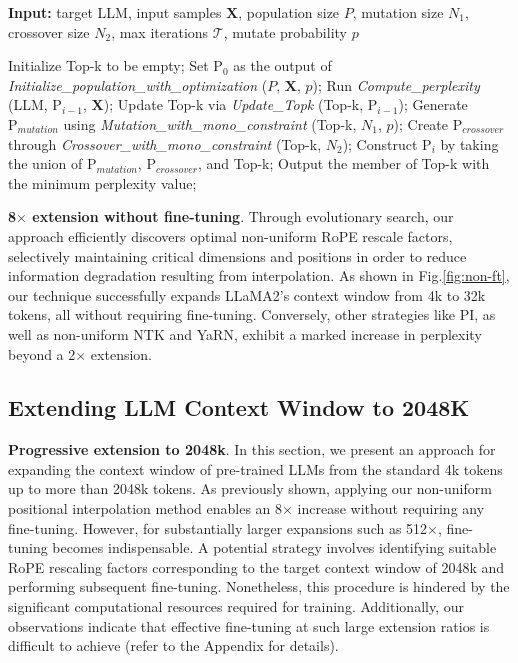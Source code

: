 \begin{algorithm}[t]
	\small
	\caption{The search algorithm}
	\textbf{Input:} target LLM, input samples $\mathbf{X}$, population size $P$, mutation size $N_1$, crossover size $N_2$, max iterations $\mathcal{T}$, mutate probability $p$\\

	\begin{algorithmic}[1]
		\label{alg:search}
		\STATE Initialize Top-k to be empty;
		\STATE Set $\text{P}_0$ as the output of \textit{Initialize\_population\_with\_optimization} ($P$, $\mathbf{X}$, $p$);
		\STATE Run \textit{Compute\_perplexity} (LLM, $\text{P}_{i-1}$, $\mathbf{X}$);
		\STATE Update Top-k via \textit{Update\_Topk} (Top-k, $\text{P}_{i-1}$);
		\STATE Generate $\text{P}_{mutation}$ using \textit{Mutation\_with\_mono\_constraint} (Top-k, $N_1$, $p$);
		\STATE Create $\text{P}_{crossover}$ through \textit{Crossover\_with\_mono\_constraint} (Top-k, $N_2$);
		\STATE Construct $\text{P}_i$ by taking the union of $\text{P}_{mutation}$, $\text{P}_{crossover}$, and Top-k;
		\ENDFOR
		\STATE Output the member of Top-k with the minimum perplexity value;
	\end{algorithmic}
\end{algorithm}

\textbf{8$\times$ extension without fine-tuning}. Through evolutionary search, our approach efficiently discovers optimal non-uniform RoPE rescale factors, selectively maintaining critical dimensions and positions in order to reduce information degradation resulting from interpolation. As shown in Fig.\ref{fig:non-ft}, our technique successfully expands LLaMA2's context window from 4k to 32k tokens, all without requiring fine-tuning. Conversely, other strategies like PI, as well as non-uniform NTK and YaRN, exhibit a marked increase in perplexity beyond a 2$\times$ extension.

\subsection{Extending LLM Context Window to 2048K}
\label{sec:extendto2048k}

\textbf{Progressive extension to 2048k}. In this section, we present an approach for expanding the context window of pre-trained LLMs from the standard 4k tokens up to more than 2048k tokens. As previously shown, applying our non-uniform positional interpolation method enables an 8$\times$ increase without requiring any fine-tuning. However, for substantially larger expansions such as 512$\times$, fine-tuning becomes indispensable. A potential strategy involves identifying suitable RoPE rescaling factors corresponding to the target context window of 2048k and performing subsequent fine-tuning. Nonetheless, this procedure is hindered by the significant computational resources required for training. Additionally, our observations indicate that effective fine-tuning at such large extension ratios is difficult to achieve (refer to the Appendix for details).

